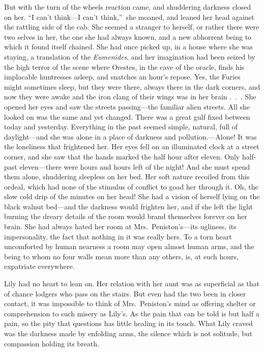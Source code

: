 \documentclass[12pt,a4paper]{book}
\begin{document}
But with the turn of the wheels reaction came, and shuddering
darkness closed on her. ``I can't think---I can't think,''\ she
moaned, and leaned her head against the rattling side of the cab. 
She seemed a stranger to herself, or rather there were two selves
in her, the one she had always known, and a new abhorrent being
to which it found itself chained. She had once picked up, in a
house where she was staying, a translation of the \textit{Eumenides}, and
her imagination had been seized by the high terror of the scene
where Orestes, in the cave of the oracle, finds his implacable
huntresses asleep, and snatches an hour's repose. Yes, the Furies
might sometimes sleep, but they were there, always there in the
dark corners, and now they were awake and the iron clang of their
wings was in her brain .\ .\ . She opened her eyes and saw the
streets passing---the familiar alien streets. All she looked on
was the same and yet changed. There was a great gulf fixed
between today and yesterday. Everything in the past seemed
simple, natural, full of daylight---and she was alone in a place
of darkness and pollution.---Alone! It was the loneliness that
frightened her. Her eyes fell on an illuminated clock at a street
corner, and she saw that the hands marked the half hour after
eleven. Only half-past eleven---there were hours and hours left of
the night! And she must spend them alone, shuddering sleepless on
her bed. Her soft nature recoiled from this ordeal, which had
none of the stimulus of conflict to goad her through it. Oh, the
slow cold drip of the minutes on her head! She had a
vision of herself lying on the black walnut bed---and the darkness
would frighten her, and if she left the light burning the dreary
details of the room would brand themselves forever on her brain. 
She had always hated her room at Mrs.\ Peniston's---its ugliness,
its impersonality, the fact that nothing in it was really hers. 
To a torn heart uncomforted by human nearness a room may open
almost human arms, and the being to whom no four walls mean more
than any others, is, at such hours, expatriate everywhere.





Lily had no heart to lean on. Her relation with her aunt was as
superficial as that of chance lodgers who pass on the stairs. But
even had the two been in closer contact, it was impossible to
think of Mrs.\ Peniston's mind as offering shelter or
comprehension to such misery as Lily's. As the pain that can be
told is but half a pain, so the pity that questions has little
healing in its touch. What Lily craved was the darkness made by
enfolding arms, the silence which is not solitude, but compassion
holding its breath.
\end{document}
